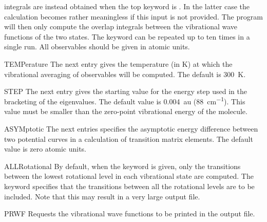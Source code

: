 \begin{keywordlist}
integrals are instead obtained when the top keyword is . In the latter case the calculation becomes rather meaningless if
this input is not provided. The program will then only compute the overlap
integrals between the vibrational wave functions of the two states.
The keyword  can be repeated up to ten times in a
single run. All observables should be given in atomic units.
\item[TEMPerature]
The next entry gives the temperature (in K) at which the vibrational
averaging of observables will be computed. The default is 300~K.
\item[STEP]
The next entry gives the starting value for the energy step used in
the bracketing of the eigenvalues. The default value is 0.004~au
(88~cm\textsuperscript{$-1$}). This value must be smaller than the
zero-point vibrational energy of the molecule.
\item[ASYMptotic]
The next entries specifies the asymptotic energy difference between
two potential curves in a calculation of transition matrix elements.
The default value is zero atomic units.
\item[ALLRotational]
By default, when the  keyword is given, only the
transitions between the lowest rotational level in each vibrational state are
computed. The keyword  specifies that the transitions
between all the rotational levels are to be included. Note that this may result
in a very large output file.
\item[PRWF]
Requests the vibrational wave functions to be printed in the output file.
\end{keywordlist}

